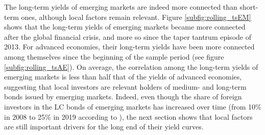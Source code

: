 {The long-term yields of emerging markets are indeed more connected than short-term ones, although local factors remain relevant.
Figure \ref{subfig:rolling_tsEM} shows that the long-term yields of emerging markets became more connected after the global financial crisis, and more so since the taper tantrum episode of 2013. 
For advanced economies, their long-term yields have been more connected among themselves since the beginning of the sample period (see figure \ref{subfig:rolling_tsAE}). On average, the correlation among the long-term yields of emerging markets is less than half that of the yields of advanced economies, suggesting that local investors are relevant holders of medium- and long-term bonds issued by emerging markets. Indeed, even though the share of foreign investors in the LC bonds of emerging markets has increased over time (from 10\% in 2008 to 25\% in 2019 according to \cite{KolasaWesolowski:2020}), the next section shows that local factors %
are still important drivers for the long end of their yield curves.

}
